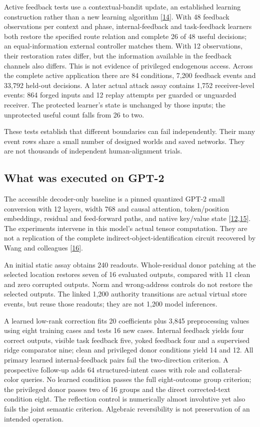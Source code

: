 \documentclass[11pt,letterpaper]{article}
\begin{document}
Active feedback tests use a contextual-bandit update, an established learning construction rather than a new learning algorithm [\hyperref[ref:14]{14}]. With 48 feedback observations per context and phase, internal-feedback and task-feedback learners both restore the specified route relation and complete 26 of 48 useful decisions; an equal-information external controller matches them. With 12 observations, their restoration rates differ, but the information available in the feedback channels also differs. This is not evidence of privileged endogenous access. Across the complete active application there are 84 conditions, 7,200 feedback events and 33,792 held-out decisions. A later actual attack assay contains 1,752 receiver-level events: 864 forged inputs and 12 replay attempts per guarded or unguarded receiver. The protected learner's state is unchanged by those inputs; the unprotected useful count falls from 26 to two.

These tests establish that different boundaries can fail independently. Their many event rows share a small number of designed worlds and saved networks. They are not thousands of independent human-alignment trials.

\subsection{What was executed on GPT-2}

The accessible decoder-only baseline is a pinned quantized GPT-2 small conversion with 12 layers, width 768 and causal attention, token/position embeddings, residual and feed-forward paths, and native key/value state [\hyperref[ref:12]{12},\hyperref[ref:15]{15}]. The experiments intervene in this model's actual tensor computation. They are not a replication of the complete indirect-object-identification circuit recovered by Wang and colleagues [\hyperref[ref:16]{16}].

An initial static assay obtains 240 readouts. Whole-residual donor patching at the selected location restores seven of 16 evaluated outputs, compared with 11 clean and zero corrupted outputs. Norm and wrong-address controls do not restore the selected outputs. The linked 1,200 authority transitions are actual virtual store events, but reuse those readouts; they are not 1,200 model inferences.

A learned low-rank correction fits 20 coefficients plus 3,845 preprocessing values using eight training cases and tests 16 new cases. Internal feedback yields four correct outputs, visible task feedback five, yoked feedback four and a supervised ridge comparator nine; clean and privileged donor conditions yield 14 and 12. All primary learned internal-feedback pairs fail the two-direction criterion. A prospective follow-up adds 64 structured-intent cases with role and collateral-color queries. No learned condition passes the full eight-outcome group criterion; the privileged donor passes two of 16 groups and the direct corrected-text condition eight. The reflection control is numerically almost involutive yet also fails the joint semantic criterion. Algebraic reversibility is not preservation of an intended operation.
\end{document}
